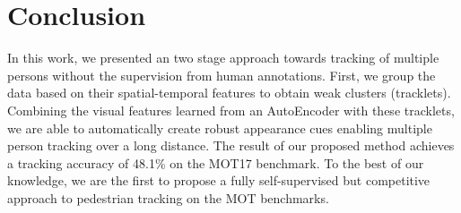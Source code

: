 \section{Conclusion}
\label{sec:conclusion}
In this work, we presented an two stage approach towards tracking of multiple persons without the supervision from human annotations. 
First, we group the data based on their spatial-temporal features to obtain weak clusters (tracklets).
Combining the visual features learned from an AutoEncoder with these tracklets, we are able to automatically create robust appearance cues enabling multiple person tracking over a long distance. The result of our proposed method achieves a tracking accuracy of 48.1\% on the MOT17 benchmark.
To the best of our knowledge, we are the first to propose a fully self-supervised but competitive approach to pedestrian tracking on the MOT benchmarks. 

\newpage